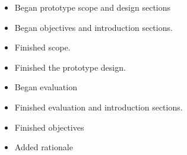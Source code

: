 \begin{itemize}

\item Began prototype scope and design sections

\item Began objectives and introduction sections.

\item Finished scope.

\item Finished the prototype design.

\item Began evaluation

\item Finished evaluation and introduction sections.

\item Finished objectives

\item Added rationale

\end{itemize}
